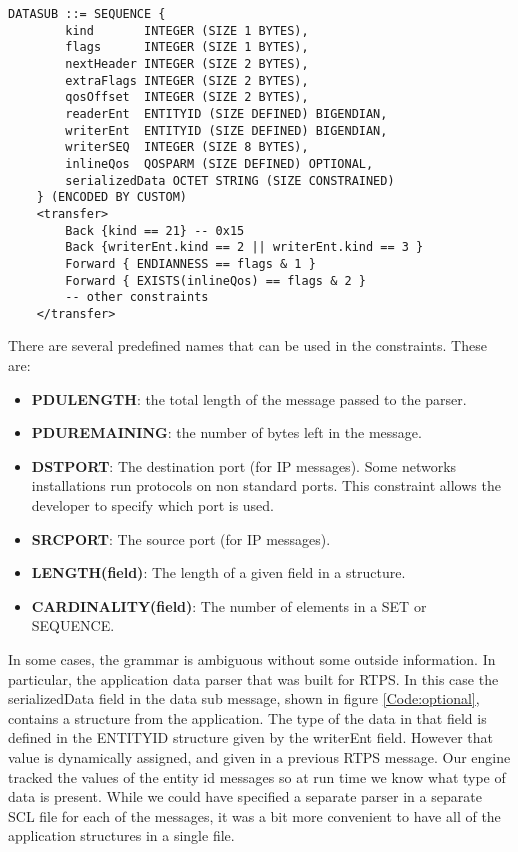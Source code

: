\documentclass[12pt,oneside,letterpaper]{article}
\begin{document}
\begin{lstlisting}[language=SCL2,style=mystyle,frame=none,
caption=Example of Exists and Endian Constraints,label=Code:optional, xleftmargin=3.5ex]
    DATASUB ::= SEQUENCE {
        kind       INTEGER (SIZE 1 BYTES),
        flags      INTEGER (SIZE 1 BYTES),
        nextHeader INTEGER (SIZE 2 BYTES),
        extraFlags INTEGER (SIZE 2 BYTES),
        qosOffset  INTEGER (SIZE 2 BYTES),
        readerEnt  ENTITYID (SIZE DEFINED) BIGENDIAN,
        writerEnt  ENTITYID (SIZE DEFINED) BIGENDIAN,
        writerSEQ  INTEGER (SIZE 8 BYTES),
        inlineQos  QOSPARM (SIZE DEFINED) OPTIONAL,
        serializedData OCTET STRING (SIZE CONSTRAINED)
    } (ENCODED BY CUSTOM)
    <transfer>
        Back {kind == 21} -- 0x15
        Back {writerEnt.kind == 2 || writerEnt.kind == 3 }
        Forward { ENDIANNESS == flags & 1 }
        Forward { EXISTS(inlineQos) == flags & 2 }
        -- other constraints
    </transfer>
\end{lstlisting}

There are several predefined names that can be used in the constraints. These are:
\begin{itemize}
    \item \textbf{PDULENGTH}: the total length of the message passed to the parser.
    \item \textbf{PDUREMAINING}: the number of bytes left in the message.
    \item \textbf{DSTPORT}: The destination port (for IP messages). Some networks installations run protocols on non standard ports. This constraint allows the developer to specify which port is used.
    \item \textbf{SRCPORT}: The source port (for IP messages).
    \item \textbf{LENGTH(field)}: The length of a given field in a structure.
    \item \textbf{CARDINALITY(field)}: The number of elements in a SET or SEQUENCE.
\end{itemize}

In some cases, the grammar is ambiguous without some outside information. In particular, the application data parser that was built for RTPS. In this case the serializedData field in the data sub message, shown in figure \ref{Code:optional}, contains a structure from the application. The type of the data in that field is defined in the ENTITYID structure given by the writerEnt field. However that value is dynamically assigned, and given in a previous RTPS message. Our engine tracked the values of the entity id messages so at run time we know what type of data is present. While we could have specified a separate parser in a separate SCL file for each of the messages, it was a bit more convenient to have all of the application structures in a single file.
\end{document}
